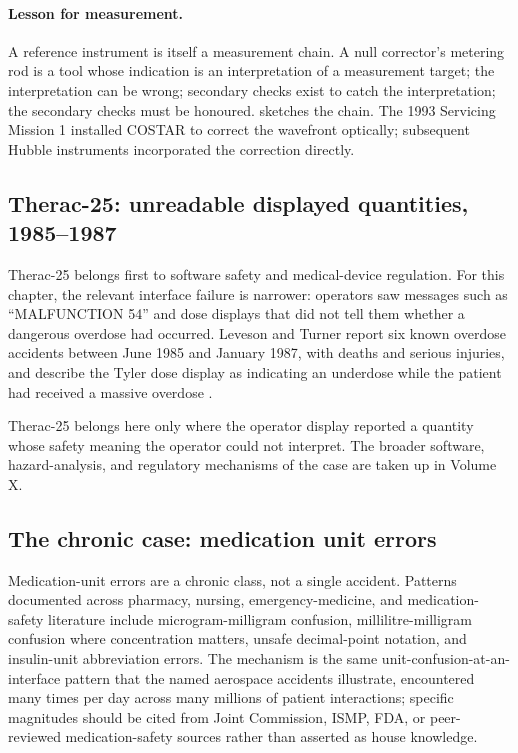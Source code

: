 \paragraph{Lesson for measurement.} A reference instrument is itself
a measurement chain. A null corrector's metering rod is a tool whose
indication is an interpretation of a measurement target; the
interpretation can be wrong; secondary checks exist to catch the
interpretation; the secondary checks must be honoured.
 sketches the chain. The
1993 Servicing Mission 1 installed COSTAR to correct the wavefront
optically; subsequent Hubble instruments incorporated the correction
directly.



\subsection{Therac-25: unreadable displayed quantities, 1985--1987}

Therac-25 belongs first to software safety and medical-device
regulation. For this chapter, the relevant interface failure is
narrower: operators saw messages such as ``MALFUNCTION 54'' and dose
displays that did not tell them whether a dangerous overdose had
occurred. Leveson and Turner report six known overdose accidents
between June 1985 and January 1987, with deaths and serious
injuries, and describe the Tyler dose display as indicating an
underdose while the patient had received a massive overdose
\cite{paper:leveson-turner1993}.

Therac-25 belongs here only where the operator display reported a
quantity whose safety meaning the operator could not interpret. The
broader software, hazard-analysis, and regulatory mechanisms of the
case are taken up in Volume X.

\subsection{The chronic case: medication unit errors}

Medication-unit errors are a chronic class, not a single accident.
Patterns documented across pharmacy, nursing, emergency-medicine, and
medication-safety literature include microgram-milligram confusion,
millilitre-milligram confusion where concentration matters, unsafe
decimal-point notation, and insulin-unit abbreviation errors. The
mechanism is the same unit-confusion-at-an-interface pattern that the
named aerospace accidents illustrate, encountered many times per day
across many millions of patient interactions; specific magnitudes
should be cited from Joint Commission, ISMP, FDA, or peer-reviewed
medication-safety sources rather than asserted as house knowledge.


